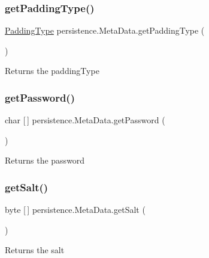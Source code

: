 \subsubsection{\texorpdfstring{get\+Padding\+Type()}{getPaddingType()}}
{\footnotesize\ttfamily \mbox{\hyperlink{enumenums_1_1_padding_type}{Padding\+Type}} persistence.\+Meta\+Data.\+get\+Padding\+Type (\begin{DoxyParamCaption}{ }\end{DoxyParamCaption})}

\begin{DoxyReturn}{Returns}
the padding\+Type 
\end{DoxyReturn}
\mbox{\label{classpersistence_1_1_meta_data_ab1931de4f8e78975c63262181a054de2}} 
\subsubsection{\texorpdfstring{get\+Password()}{getPassword()}}
{\footnotesize\ttfamily char \mbox{[}$\,$\mbox{]} persistence.\+Meta\+Data.\+get\+Password (\begin{DoxyParamCaption}{ }\end{DoxyParamCaption})}

\begin{DoxyReturn}{Returns}
the password 
\end{DoxyReturn}
\mbox{\label{classpersistence_1_1_meta_data_ab65ed5e7f5b5b0ea1a993f00116e4d54}} 
\subsubsection{\texorpdfstring{get\+Salt()}{getSalt()}}
{\footnotesize\ttfamily byte \mbox{[}$\,$\mbox{]} persistence.\+Meta\+Data.\+get\+Salt (\begin{DoxyParamCaption}{ }\end{DoxyParamCaption})}

\begin{DoxyReturn}{Returns}
the salt 
\end{DoxyReturn}
\mbox{\label{classpersistence_1_1_meta_data_a465f5b971663fa5082d3ce35fe724cc0}} 
